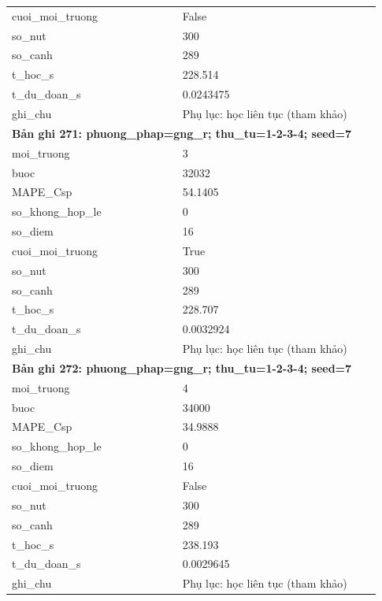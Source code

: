 \begin{longtable}{p{0.43\linewidth}p{0.50\linewidth}}
cuoi\_\allowbreak moi\_\allowbreak truong & False \\
so\_\allowbreak nut & 300 \\
so\_\allowbreak canh & 289 \\
t\_\allowbreak hoc\_\allowbreak s & 228.514 \\
t\_\allowbreak du\_\allowbreak doan\_\allowbreak s & 0.0243475 \\
ghi\_\allowbreak chu & Phụ lục: học liên tục (tham khảo) \\
\midrule
\multicolumn{2}{p{0.95\linewidth}}{\textbf{Bản ghi 271: phuong\_phap=gng\_r; thu\_tu=1-2-3-4; seed=7}} \\
moi\_\allowbreak truong & 3 \\
buoc & 32032 \\
MAPE\_\allowbreak Csp & 54.1405 \\
so\_\allowbreak khong\_\allowbreak hop\_\allowbreak le & 0 \\
so\_\allowbreak diem & 16 \\
cuoi\_\allowbreak moi\_\allowbreak truong & True \\
so\_\allowbreak nut & 300 \\
so\_\allowbreak canh & 289 \\
t\_\allowbreak hoc\_\allowbreak s & 228.707 \\
t\_\allowbreak du\_\allowbreak doan\_\allowbreak s & 0.0032924 \\
ghi\_\allowbreak chu & Phụ lục: học liên tục (tham khảo) \\
\midrule
\multicolumn{2}{p{0.95\linewidth}}{\textbf{Bản ghi 272: phuong\_phap=gng\_r; thu\_tu=1-2-3-4; seed=7}} \\
moi\_\allowbreak truong & 4 \\
buoc & 34000 \\
MAPE\_\allowbreak Csp & 34.9888 \\
so\_\allowbreak khong\_\allowbreak hop\_\allowbreak le & 0 \\
so\_\allowbreak diem & 16 \\
cuoi\_\allowbreak moi\_\allowbreak truong & False \\
so\_\allowbreak nut & 300 \\
so\_\allowbreak canh & 289 \\
t\_\allowbreak hoc\_\allowbreak s & 238.193 \\
t\_\allowbreak du\_\allowbreak doan\_\allowbreak s & 0.0029645 \\
ghi\_\allowbreak chu & Phụ lục: học liên tục (tham khảo) \\

\end{longtable}
